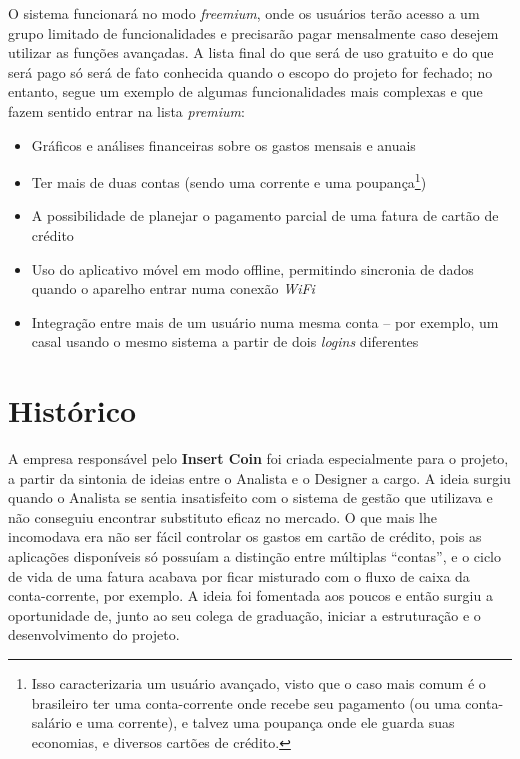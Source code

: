 \documentclass[a4paper]{abnt}
\begin{document}
O sistema funcionará no modo \textit{freemium}, onde os usuários terão acesso a um grupo limitado de funcionalidades e precisarão pagar mensalmente caso desejem utilizar as funções avançadas. A lista final do que será de uso gratuito e do que será pago só será de fato conhecida quando o escopo do projeto for fechado; no entanto, segue um exemplo de algumas funcionalidades mais complexas e que fazem sentido entrar na lista \textit{premium}:
\begin{itemize}
	\item Gráficos e análises financeiras sobre os gastos mensais e anuais
	\item Ter mais de duas contas (sendo uma corrente e uma poupança\footnote{Isso caracterizaria um usuário avançado, visto que o caso mais comum é o brasileiro ter uma conta-corrente onde recebe seu pagamento (ou uma conta-salário e uma corrente), e talvez uma poupança onde ele guarda suas economias, e diversos cartões de crédito.})
	\item A possibilidade de planejar o pagamento parcial de uma fatura de cartão de crédito
	\item Uso do aplicativo móvel em modo offline, permitindo sincronia de dados quando o aparelho entrar numa conexão \textit{WiFi}
	\item Integração entre mais de um usuário numa mesma conta -- por exemplo, um casal usando o mesmo sistema a partir de dois \textit{logins} diferentes
\end{itemize}
 
\section{Histórico}
A empresa responsável pelo \textbf{Insert Coin} foi criada especialmente para o projeto, a partir da sintonia de ideias entre o Analista e o Designer a cargo. A ideia surgiu quando o Analista se sentia insatisfeito com o sistema de gestão que utilizava e não conseguiu encontrar substituto eficaz no mercado. O que mais lhe incomodava era não ser fácil controlar os gastos em cartão de crédito, pois as aplicações disponíveis só possuíam a distinção entre múltiplas ``contas'', e o ciclo de vida de uma fatura acabava por ficar misturado com o fluxo de caixa da conta-corrente, por exemplo. A ideia foi fomentada aos poucos e então surgiu a oportunidade de, junto ao seu colega de graduação, iniciar a estruturação e o desenvolvimento do projeto.
\end{document}
